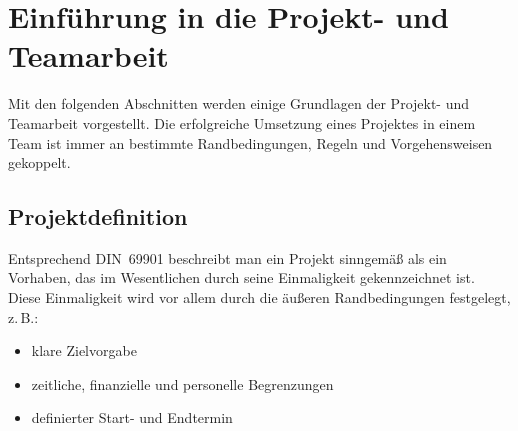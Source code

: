 \documentclass{wbh-studienheft}
\begin{document}
\maketitlepage
\makecopyrightpage
\tableofcontents
\clearpage


\chapter{Einführung in die Projekt- und Teamarbeit}


Mit den folgenden Abschnitten werden einige Grundlagen der Projekt- und
Teamarbeit vorgestellt. Die erfolgreiche Umsetzung eines Projektes in
einem Team ist immer an bestimmte Randbedingungen, Regeln und
Vorgehensweisen gekoppelt.

\section{Projektdefinition}

Entsprechend DIN~69901 beschreibt man ein Projekt sinngemäß als ein
Vorhaben, das im Wesentlichen durch seine Einmaligkeit gekennzeichnet
ist. Diese Einmaligkeit wird vor allem durch die äußeren Randbedingungen
festgelegt, z.\,B.:

\begin{itemize}[nosep]
  \item klare Zielvorgabe
  \item zeitliche, finanzielle und personelle Begrenzungen
  \item definierter Start- und Endtermin
\end{itemize}
\end{document}
